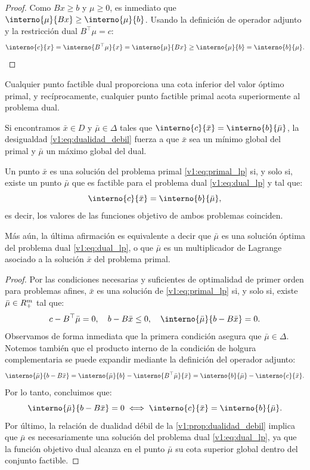 \begin{proof}
 Como $Bx \ge b$ y $\mu \ge 0$, es inmediato que $\interno{\mu}{Bx} \ge \interno{\mu}{b}$. Usando la definición de operador adjunto y la restricción dual $B^\top \mu = c$:
 \[
 \interno{c}{x} = \interno{B^\top \mu}{x} = \interno{\mu}{Bx} \ge \interno{\mu}{b} = \interno{b}{\mu}.
 \]
\end{proof}

Cualquier punto factible dual proporciona una cota inferior del valor óptimo primal, y recíprocamente, cualquier punto factible primal acota superiormente al problema dual.

\begin{notabox}
 Si encontramos $\bar{x} \in D$ y $\bar{\mu} \in \Delta$ tales que $\interno{c}{\bar{x}} = \interno{b}{\bar{\mu}}$, la desigualdad \eqref{v1:eq:dualidad_debil} fuerza a que $\bar{x}$ sea un mínimo global del primal y $\bar{\mu}$ un máximo global del dual.
\end{notabox}

\begin{theorem}\label{v1:thm:optimalidad_lp}
 Un punto $\bar{x}$ es una solución del problema primal \eqref{v1:eq:primal_lp} si, y solo si, existe un punto $\bar{\mu}$ que es factible para el problema dual \eqref{v1:eq:dual_lp} y tal que:
 \begin{equation}
 \interno{c}{\bar{x}} = \interno{b}{\bar{\mu}},
 \end{equation}
 es decir, los valores de las funciones objetivo de ambos problemas coinciden.
 
 Más aún, la última afirmación es equivalente a decir que $\bar{\mu}$ es una solución óptima del problema dual \eqref{v1:eq:dual_lp}, o que $\bar{\mu}$ es un multiplicador de Lagrange asociado a la solución $\bar{x}$ del problema primal.
\end{theorem}

\begin{proof}
 Por las condiciones necesarias y suficientes de optimalidad de primer orden para problemas afines, $\bar{x}$ es una solución de \eqref{v1:eq:primal_lp} si, y solo si, existe $\bar{\mu} \in R^m_+$ tal que:
 \[
 c - B^\top \bar{\mu} = 0, \quad b - B\bar{x} \le 0, \quad \interno{\bar{\mu}}{b - B\bar{x}} = 0.
 \]
 Observamos de forma inmediata que la primera condición asegura que $\bar{\mu} \in \Delta$. Notemos también que el producto interno de la condición de holgura complementaria se puede expandir mediante la definición del operador adjunto:
 \[
 \interno{\bar{\mu}}{b - B\bar{x}} = \interno{\bar{\mu}}{b} - \interno{B^\top \bar{\mu}}{\bar{x}} = \interno{b}{\bar{\mu}} - \interno{c}{\bar{x}}.
 \]
 Por lo tanto, concluimos que:
 \[
 \interno{\bar{\mu}}{b - B\bar{x}} = 0 \iff \interno{c}{\bar{x}} = \interno{b}{\bar{\mu}}.
 \]
 Por último, la relación de dualidad débil de la \cref{v1:prop:dualidad_debil} implica que $\bar{\mu}$ es necesariamente una solución del problema dual \eqref{v1:eq:dual_lp}, ya que la función objetivo dual alcanza en el punto $\bar{\mu}$ su cota superior global dentro del conjunto factible.
\end{proof}

